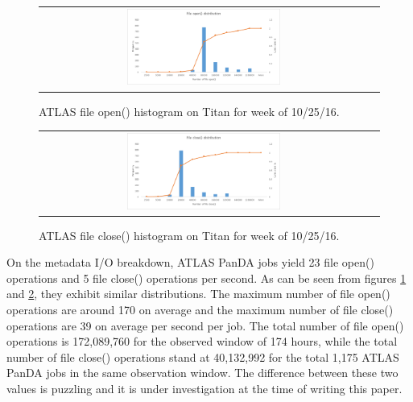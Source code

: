 \begin{figure}[!htb]
    \centering
    \begin{tabular}{cc}
        {\includegraphics[width=0.48\textwidth]{figures/panda_file_open_hist.pdf}}\\
    \end{tabular}
    \caption{ATLAS file open() histogram on Titan for week of 10/25/16.}
    \label{fig:atlas-titan-file-open}
\end{figure}


\begin{figure}[!htb]
    \centering
    \begin{tabular}{cc}
        {\includegraphics[width=0.48\textwidth]{figures/panda_file_close_hist.pdf}}\\
    \end{tabular}
    \caption{ATLAS file close() histogram on Titan for week of 10/25/16.}
    \label{fig:atlas-titan-file-close}
\end{figure}

On the metadata I/O breakdown, ATLAS PanDA jobs yield 23 file open() operations
and 5 file close() operations per second. As can be seen from figures
\ref{fig:atlas-titan-file-open} and \ref{fig:atlas-titan-file-close}, they
exhibit similar distributions. The maximum number of file open() operations are
around 170 on average and the maximum number of file close() operations are 39
on average per second per job. The total number of file open() operations is
172,089,760 for the observed window of 174 hours, while the total number of
file close() operations stand at 40,132,992 for the total 1,175 ATLAS PanDA
jobs in the same observation window. The difference between these two values is
puzzling and it is under investigation at the time of writing this paper.
{} 



